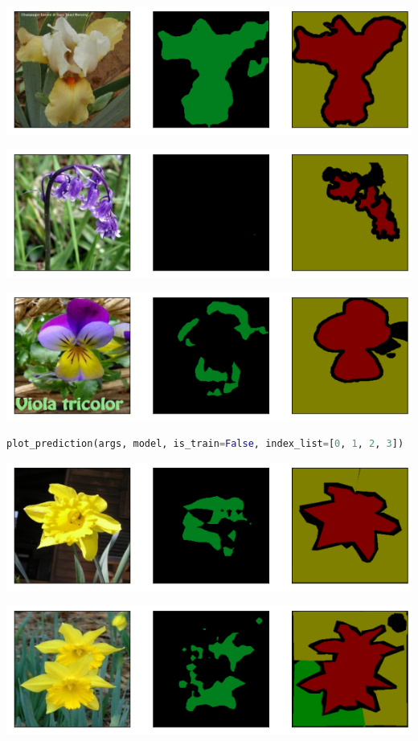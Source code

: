\documentclass{article}
\begin{document}
\includegraphics[width=\textwidth]{D1-3.1.2.png}

\includegraphics[width=\textwidth]{D1-3.1.3.png}

\includegraphics[width=\textwidth]{D1-3.1.4.png}

\begin{lstlisting}[language=Python]
plot_prediction(args, model, is_train=False, index_list=[0, 1, 2, 3])
\end{lstlisting}


\includegraphics[width=\textwidth]{D1-3.2.1.png}

\includegraphics[width=\textwidth]{D1-3.2.2.png}
\end{document}
